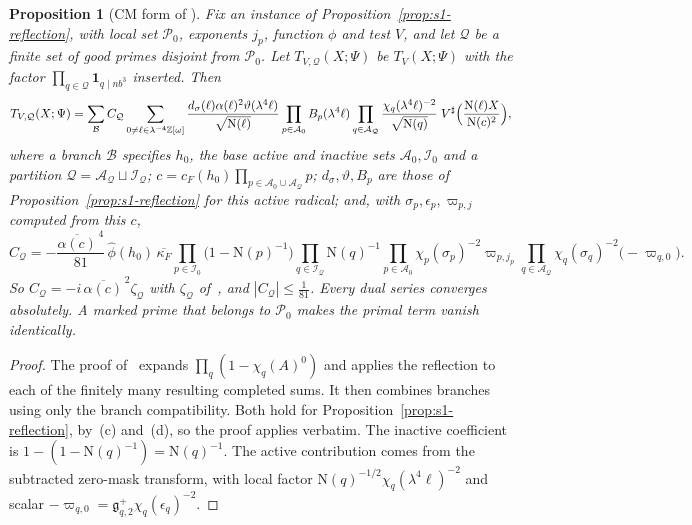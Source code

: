\documentclass[11pt]{article}
\numberwithin{equation}{section}
\newcommand{\OO}{\mathbb Z[\omega]}
\newcommand{\N}{\mathrm N}
\newcommand{\ind}{\mathbf1}
\newtheorem{proposition}{Proposition}
\begin{document}
\begin{proposition}[CM form of {\cite[Cor.~14.1]{OAI78}}]\label{prop:s1-marked}
Fix an instance of Proposition~\ref{prop:s1-reflection}, with local set $\mathcal P_0$, exponents $j_p$, function
$\phi$ and test $V$, and let $\mathcal Q$ be a finite set of good primes disjoint from $\mathcal P_0$. Let
$T_{V,\mathcal Q}(X;\Psi)$ be $T_V(X;\Psi)$ with the factor $\prod_{q\in\mathcal Q}\ind_{q\mid nb^3}$ inserted. Then
\begin{equation}\label{eq:d138}
 T_{V,\mathcal Q}(X;\Psi)=\sum_{\mathcal B}C_{\mathcal Q}\sum_{0\ne\ell\in\lambda^{-4}\OO}
 \frac{d_\sigma(\ell)\alpha(\ell)^2\vartheta(\lambda^4\ell)}{\sqrt{\N(\ell)}}\prod_{p\in\mathcal A_0}B_p(\lambda^4\ell)
 \prod_{q\in\mathcal A_{\mathcal Q}}\frac{\chi_q(\lambda^4\ell)^{-2}}{\sqrt{\N(q)}}\;
 V^\sharp\Bigl(\frac{\N(\ell)X}{\N(c)^2}\Bigr),
\end{equation}
where a branch $\mathcal B$ specifies $h_0$, the base active and inactive sets $\mathcal A_0,\mathcal I_0$ and a
partition $\mathcal Q=\mathcal A_{\mathcal Q}\sqcup\mathcal I_{\mathcal Q}$; $c=c_F(h_0)\prod_{p\in\mathcal
A_0\cup\mathcal A_{\mathcal Q}}p$; $d_\sigma,\vartheta,B_p$ are those of Proposition~\ref{prop:s1-reflection} for this active
radical; and, with $\sigma_p,\epsilon_p,\varpi_{p,j}$ computed from this $c$,
\begin{equation}\label{eq:d139}
 C_{\mathcal Q}=-\frac{\overline{\alpha(c)}^{\,4}}{81}\,\widehat\phi(h_0)\,\overline{\kappa_F}
 \prod_{p\in\mathcal I_0}\bigl(1-\N(p)^{-1}\bigr)\prod_{q\in\mathcal I_{\mathcal Q}}\N(q)^{-1}
 \prod_{p\in\mathcal A_0}\chi_p(\sigma_p)^{-2}\varpi_{p,j_p}
 \prod_{q\in\mathcal A_{\mathcal Q}}\chi_q(\sigma_q)^{-2}\bigl(-\varpi_{q,0}\bigr).
\end{equation}
So $C_{\mathcal Q}=-i\,\overline{\alpha(c)}^{\,2}\zeta_{\mathcal Q}$ with $\zeta_{\mathcal Q}$
of~\cite[eq.~(14.4)]{OAI78}, and $|C_{\mathcal Q}|\le\frac1{81}$. Every dual series converges
absolutely. A marked prime that belongs to $\mathcal P_0$ makes the primal term vanish identically.
\end{proposition}

\begin{proof}
The proof of~\cite[Cor.~14.1]{OAI78} expands $\prod_q(1-\chi_q(A)^0)$ and applies the
reflection to each of the finitely many resulting completed sums. It then combines branches using only the branch
compatibility. Both hold for Proposition~\ref{prop:s1-reflection}, by~(c) and~(d), so the proof applies verbatim. The
inactive coefficient is $1-(1-\N(q)^{-1})=\N(q)^{-1}$. The active contribution comes from the subtracted zero-mask
transform, with local factor $\N(q)^{-1/2}\chi_q(\lambda^4\ell)^{-2}$ and scalar
$-\varpi_{q,0}=\mathfrak g^+_{q,2}\chi_q(\epsilon_q)^{-2}$.
\end{proof}
\end{document}
